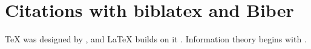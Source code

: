 \documentclass{article}
\begin{document}
\section*{Citations with biblatex and Biber}
\TeX{} was designed by \textcite{knuth1984}, and \LaTeX{} builds on it
\parencite{lamport1994}. Information theory begins with \textcite{shannon1948}.

\printbibliography
\end{document}
